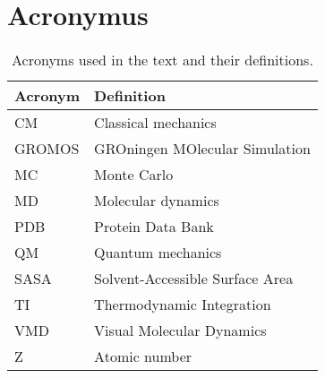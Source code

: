 \section*{Acronymus}

\begin{table}[th]
    \centering
    \begin{tabular}{l|l}
    \toprule
         Acronym &  Definition\\
         \midrule
         CM & Classical mechanics\\
         GROMOS & GROningen MOlecular Simulation\\
         MC & Monte Carlo\\
         MD & Molecular dynamics\\
         PDB & Protein Data Bank\\
         QM & Quantum mechanics\\
         SASA & Solvent-Accessible Surface Area\\
         TI & Thermodynamic Integration\\
         VMD & Visual Molecular Dynamics\\
         Z & Atomic number\\
         \bottomrule
    \end{tabular}
    \caption{Acronyms used in the text and their definitions.}
    \label{tab:acronymus}
\end{table}